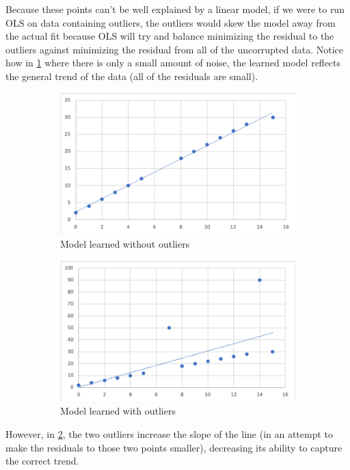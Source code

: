   Because these points can't be well explained by a linear model, if we were to run OLS on data containing outliers, the outliers would skew the model away from the actual fit because OLS will try and balance minimizing the residual to the outliers against minimizing the residual from all of the uncorrupted data.
  Notice how in \cref{fig:good-fit} where there is only a small amount of noise, the learned model reflects the general trend of the data (all of the residuals are small).
  \begin{figure}[!h]
	\centering
	\begin{subfigure}{0.45\textwidth}
	  \centering
	  \includegraphics[width=\textwidth]{Images/good_fit}
	  \caption{Model learned without outliers}
	  \label{fig:good-fit}
	\end{subfigure}
	\begin{subfigure}{0.45\textwidth}  
	  \centering
	  \includegraphics[width=\textwidth]{Images/outlier_fit}
	  \caption{Model learned with outliers}
	  \label{fig:outlier-fit}
	\end{subfigure}
	\caption{}
	\label{fig:different-fits}
  \end{figure}
  However, in \cref{fig:outlier-fit}, the two outliers increase the slope of the line (in an attempt to make the residuals to those two points smaller), decreasing its ability to capture the correct trend.
